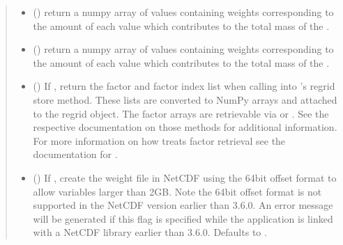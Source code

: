 \documentclass[letterpaper,10pt,english]{sphinxmanual}
\begin{document}
\begin{fulllineitems}
\begin{quote}
\begin{description}
\begin{itemize}
\item {} 
 () \textendash{} return a numpy array of values containing
weights corresponding to the amount of each {\hyperref[\detokenize{field:ESMF.api.field.Field}]{}}
value which contributes to the total mass of the {\hyperref[\detokenize{field:ESMF.api.field.Field}]{}}.

\item {} 
 () \textendash{} return a numpy array of values containing
weights corresponding to the amount of each {\hyperref[\detokenize{field:ESMF.api.field.Field}]{}}
value which contributes to the total mass of the {\hyperref[\detokenize{field:ESMF.api.field.Field}]{}}.

\item {} 
 () \textendash{} If , return the factor and factor index list
when calling into ’s regrid store method. These lists are converted
to NumPy arrays and attached to the regrid object. The factor arrays
are retrievable via  or .
See the respective documentation on those methods for additional information.
For more information on how  treats factor retrieval see the
documentation for .

\item {} 
 () \textendash{} If , create the weight file in NetCDF using the 
64\sphinxhyphen{}bit  offset format to allow variables larger than 2GB. Note the 64\sphinxhyphen{}bit offset 
format is not supported in the NetCDF version earlier than 3.6.0.  An error message 
will be generated if this flag is specified while the application is linked with a 
NetCDF library earlier than 3.6.0. Defaults to .


\end{itemize}
\end{description}
\end{quote}
\end{fulllineitems}
\end{document}
